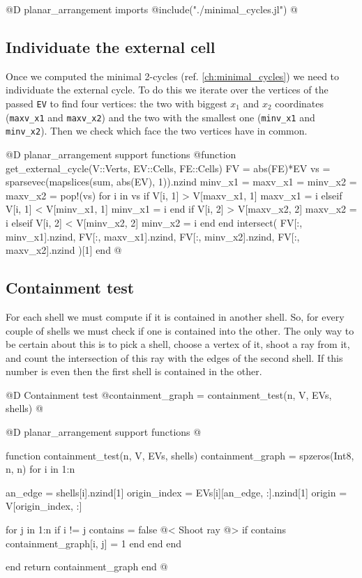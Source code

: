\documentclass[10pt]{book}
\begin{document}
@D planar\_arrangement imports
@{include("./minimal_cycles.jl")
@}

\subsection{Individuate the external cell}
Once we computed the minimal 2-cycles (ref. \ref{ch:minimal_cycles})
we need to individuate the external cycle. To do this we iterate over the
vertices of the passed \texttt{EV} to find four vertices: the two with biggest
$x_1$ and $x_2$ coordinates (\texttt{maxv\_x1} and \texttt{maxv\_x2}) and the 
two with the smallest one (\texttt{minv\_x1} and \texttt{minv\_x2}). 
Then we check which face the two vertices have in common.

@D planar\_arrangement support functions
@{function get_external_cycle(V::Verts, EV::Cells, FE::Cells)
    FV = abs(FE)*EV
    vs = sparsevec(mapslices(sum, abs(EV), 1)).nzind
    minv_x1 = maxv_x1 = minv_x2 = maxv_x2 = pop!(vs)
    for i in vs
        if V[i, 1] > V[maxv_x1, 1]
            maxv_x1 = i
        elseif V[i, 1] < V[minv_x1, 1]
            minv_x1 = i
        end
        if V[i, 2] > V[maxv_x2, 2]
            maxv_x2 = i
        elseif V[i, 2] < V[minv_x2, 2]
            minv_x2 = i
        end
    end
    intersect(
        FV[:, minv_x1].nzind, 
        FV[:, maxv_x1].nzind,
        FV[:, minv_x2].nzind,
        FV[:, maxv_x2].nzind
    )[1]
end
@}

\subsection{Containment test}

For each shell we must compute if it is contained
in another shell. So, for every couple of shells
we must check if one is contained into the other.
The only way to be certain about this is to pick 
a shell, choose a vertex of it, shoot a ray from it,
and count the intersection of this ray with the edges of
the second shell. If this number is even then the first shell
is contained in the other.

@D Containment test
@{containment_graph = containment_test(n, V, EVs, shells)
@}

@D planar\_arrangement support functions
@{function containment_test(n, V, EVs, shells)
    containment_graph = spzeros(Int8, n, n)
    for i in 1:n

        an_edge = shells[i].nzind[1]
        origin_index = EVs[i][an_edge, :].nzind[1]
        origin = V[origin_index, :]

        for j in 1:n
            if i != j
                contains = false
                @< Shoot ray @>
                if contains
                    containment_graph[i, j] = 1
                end
            end
        end

    end
    return containment_graph
end
@}
\end{document}
